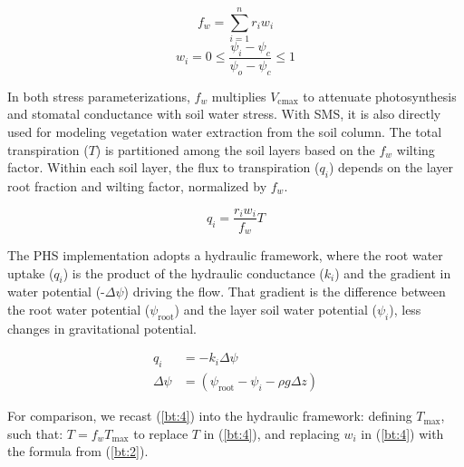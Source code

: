 \documentclass[draft,linenumbers]{agujournal}
\begin{document}
    \begin{linenomath*}
    \begin{equation} f_w = \sum_{i=1}^{n}{r_iw_i}
    \label{bt:1}
    \end{equation}
    \begin{equation} 
    \label{bt:2}
    w_i=0 \leq \dfrac{\psi_i-\psi_{c}}{\psi_{o}-\psi_{c}} \leq 1
    \end{equation}
    \end{linenomath*}
    
    In both stress parameterizations, $f_w$ multiplies $V_{\text{cmax}}$ to attenuate photosynthesis and stomatal conductance with soil water stress. 
    With SMS, it is also directly used for modeling vegetation water extraction from the soil column. 
    The total transpiration ($T$) is partitioned among the soil layers based on the $f_w$ wilting factor. 
    Within each soil layer, the flux to transpiration ($q_i$) depends on the layer root fraction and wilting factor, normalized by $f_w$.

    \begin{linenomath*}
    \begin{equation}
    \label{bt:4}
    q_i = \dfrac{r_i w_i}{f_w}T
    \end{equation}
    \end{linenomath*}
    
    The PHS implementation adopts a hydraulic framework, where the root water uptake ($q_i$) is 
    the product of the hydraulic conductance ($k_i$) and the gradient in water potential (-$\Delta\psi$) driving the flow.
    That gradient is the difference between the root water potential ($\psi_{\text{root}}$) and the layer soil water potential ($\psi_i$), less changes in gravitational potential.
    \begin{linenomath*}
    \begin{equation}
        \begin{aligned}
    q_i &= -k_i \Delta\psi \\
    \Delta\psi &= \left(\psi_{\text{root}}-\psi_{i}-\rho g \Delta z\right)
    \label{phs:sink}
    \end{aligned}
    \end{equation}
    \end{linenomath*}
    
    For comparison, we recast (\ref{bt:4}) into the hydraulic framework: defining $T_{\text{max}}$, such that: $T = 
    f_w T_{\text{max}}$ to replace $T$ in (\ref{bt:4}), and replacing $w_i$ in (\ref{bt:4}) with the formula from (\ref{bt:2}).
    
\end{document}
